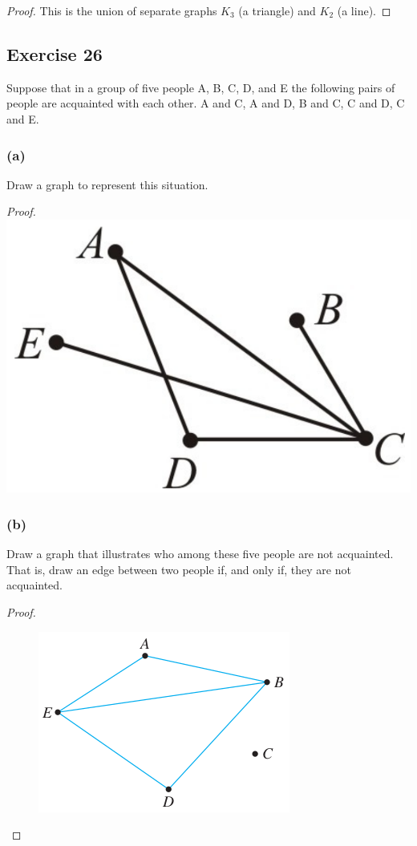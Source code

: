 \documentclass[14pt]{extarticle}
\begin{document}
\begin{proof}
    This is the union of separate graphs \(K_3\) (a triangle) and \(K_2\) (a line).
\end{proof}

\subsection{Exercise 26}
Suppose that in a group of five people A, B, C, D, and E the following pairs of people are acquainted with each other. A
and C, A and D, B and C, C and D, C and E.

\subsubsection{(a)}
Draw a graph to represent this situation.

    {\it Proof.}
\includegraphics[scale=0.15]{../images/10.1.26.a.png}

\subsubsection{(b)}
Draw a graph that illustrates who among these five people are not acquainted. That is, draw an edge between two people if,
and only if, they are not acquainted.

\begin{proof}
    \begin{figure}[ht!]
        \centering
        \includegraphics[scale=0.4]{../images/10.1.26.b.png}
    \end{figure}
\end{proof}
\end{document}
